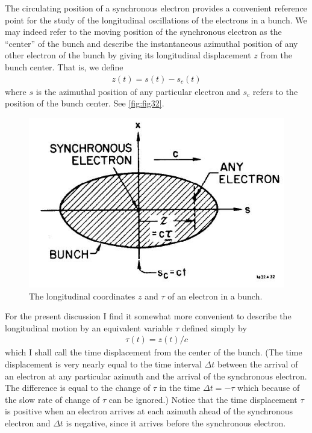 The circulating position of a synchronous electron provides a convenient reference point for the study of the longitudinal oscillations of the electrons in a bunch. We may indeed refer to the moving position of the synchronous electron as the “center” of the bunch and describe the instantaneous azimuthal position of any other electron of the bunch by giving its longitudinal displacement $z$ from the bunch center. That is, we define
\begin{align}
	z(t) = s(t) - s_c(t)
\end{align}
where $s$ is the azimuthal position of any particular electron and $s_c$ refers to the position of the bunch center. See \autoref{fig:fig32}.

\begin{figure}[!htb]
	\centering
	\includegraphics[width=0.6\linewidth]{./Figuras/fig32.jpeg}
	\caption{The longitudinal coordinates $z$ and $\tau$ of an electron in a bunch.}
	\label{fig:fig32}
\end{figure}

For the present discussion I find it somewhat more convenient to describe the longitudinal motion by an equivalent variable $\tau$ defined simply by
\begin{align}
	\tau(t) = z(t)/c
\end{align}
which I shall call the time displacement from the center of the bunch. (The time displacement is very nearly equal to the time interval $\Delta t$ between the arrival of an electron at any particular azimuth and the arrival of the synchronous electron. The difference is equal to the change of $\tau$ in the time $\Delta t = - \tau$ which because of the slow rate of change of $\tau$ can be ignored.) Notice that the time displacement $\tau$ is positive when an electron arrives at each azimuth ahead of the synchronous electron and $\Delta t$ is negative, since it arrives before the synchronous electron.

